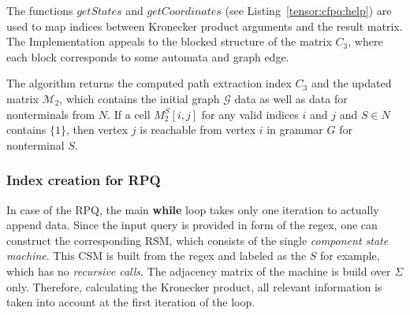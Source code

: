 The functions $getStates$ and $getCoordinates$ (see Listing~\ref{tensor:cfpq:help})
are used to map indices between Kronecker product arguments and the result matrix.
The Implementation appeals to the blocked structure of the matrix $C_3$, 
where each block corresponds to some automata and graph edge.

The algorithm returns the computed path extraction index $C_3$ and 
the updated matrix $\mathcal{M}_2$, which contains the initial 
graph $\mathcal{G}$ data as well as data for nonterminals from $N$.
If a cell $M_2^S[i,j]$ for any valid indices $i$ and $j$ and $S \in N$ 
contains $\{1\}$, then vertex $j$ is reachable from vertex $i$ in grammar $G$ for 
nonterminal $S$.

\subsubsection{Index creation for RPQ}
In case of the RPQ, the main \textbf{while} loop takes only one iteration to actually
append data. Since the input query is provided in form of the regex, one
can construct the corresponding RSM, which consists of the single 
\textit{component state machine}. This CSM is built from the regex and labeled as 
the $S$ for example, which has no \textit{recursive calls}. The adjacency 
matrix of the machine is build over $\Sigma$ only. Therefore, calculating the 
Kronecker product, all relevant information is taken into account at the first 
iteration of the loop.


